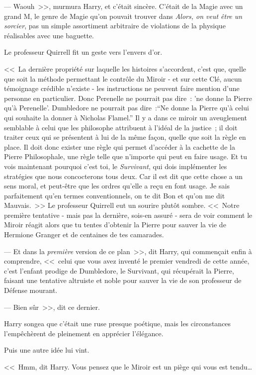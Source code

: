 --- Waouh~>>, murmura Harry, et c'était sincère. C'était de la Magie avec un grand M, le genre de Magie qu'on pouvait trouver dans \emph{Alors, on veut être un sorcier}, pas un simple assortiment arbitraire de violations de la physique réalisables avec une baguette.

Le professeur Quirrell fit un geste vers l'envers d'or.

<<~La dernière propriété sur laquelle les histoires s'accordent, c'est que, quelle que soit la méthode permettant le contrôle du Miroir - et sur cette Clé, aucun témoignage crédible n'existe - les instructions ne peuvent faire mention d'une personne en particulier. Donc Perenelle ne pourrait pas dire~: 'ne donne la Pierre qu'à Perenelle'. Dumbledore ne pourrait pas dire~:“Ne donne la Pierre qu'à celui qui souhaite la donner à Nicholas Flamel.” Il y a dans ce miroir un aveuglement semblable à celui que les philosophe attribuent à l'idéal de la justice~; il doit traiter ceux qui se présentent à lui de la même façon, quelle que soit la règle en place. Il doit donc exister une règle qui permet d'accéder à la cachette de la Pierre Philosophale, une règle telle que n'importe qui peut en faire usage. Et tu vois maintenant pourquoi c'est toi, le \emph{Survivant}, qui dois implémenter les stratégies que nous concocterons tous deux. Car il est dit que cette chose a un sens moral, et peut-être que les ordres qu'elle a reçu en font usage. Je sais parfaitement qu'en termes conventionnels, on te dit Bon et qu'on me dit Mauvais.~>> Le professeur Quirrell eut un sourire plutôt sombre. <<~Notre première tentative - mais pas la dernière, sois-en assuré - sera de voir comment le Miroir réagit alors que tu tentes d'obtenir la Pierre pour sauver la vie de Hermione Granger et de centaines de tes camarades.

--- Et dans la \emph{première} version de ce plan~>>, dit Harry, qui commençait enfin à comprendre, <<~celui que vous avez inventé le premier vendredi de cette année, c'est l'enfant prodige de Dumbledore, le Survivant, qui récupérait la Pierre, faisant une tentative altruiste et noble pour sauver la vie de son professeur de Défense mourant.

--- Bien sûr~>>, dit ce dernier.

Harry songea que c'était une ruse presque poétique, mais les circonstances l'empêchèrent de pleinement en apprécier l'élégance.

Puis une autre idée lui vint.

<<~Hmm, dit Harry. Vous pensez que le Miroir est un piège qui vous est tendu…

